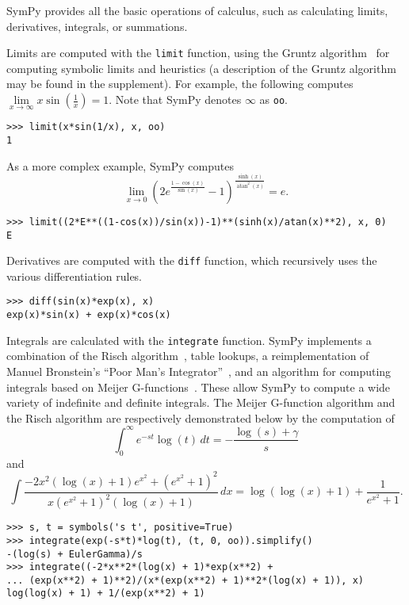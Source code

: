 SymPy provides all the basic operations of calculus, such as calculating
limits, derivatives, integrals, or summations.

Limits are computed with the \verb|limit| function, using the Gruntz
algorithm~\cite{Gruntz1996limits} for computing symbolic limits and heuristics (a description of the Gruntz algorithm may be found in the supplement).
For example, the following computes
$\lim\limits_{x\to \infty} x\sin(\frac{1}{x})=1$. Note that SymPy denotes
$\infty$ as \verb|oo|.
\begin{verbatim}
>>> limit(x*sin(1/x), x, oo)
1
\end{verbatim}
As a more complex example, SymPy computes \[\lim\limits_{x\to 0}{\left(2 e^{\frac{1 - \cos{\left (x \right )}}{\sin{\left (x \right )}}} -
  1\right)}^{\frac{\sinh{\left (x \right )}}{\operatorname{atan}^{2}{\left (x
      \right )}}} = e.\]
\begin{verbatim}
>>> limit((2*E**((1-cos(x))/sin(x))-1)**(sinh(x)/atan(x)**2), x, 0)
E
\end{verbatim}

Derivatives are computed with the \verb|diff| function, which recursively uses
the various differentiation rules.
\begin{verbatim}
>>> diff(sin(x)*exp(x), x)
exp(x)*sin(x) + exp(x)*cos(x)
\end{verbatim}

Integrals are calculated with the \verb|integrate| function. SymPy
implements a combination of the Risch
algorithm~\cite{bronstein2005integration}, table lookups, a reimplementation
of Manuel Bronstein's ``Poor Man's Integrator''~\cite{Bronstein2005pmint}, and
an algorithm for computing integrals based on Meijer G-functions~\cite{Roach1996hyper,roach1997meijerg}. These allow
SymPy to compute a wide variety of indefinite and definite integrals. The
Meijer G-function algorithm and the Risch algorithm are respectively
demonstrated below by the computation of \[\int_{0}^{\infty} e^{-s t}\log{\left (t \right )}\, dt = - \frac{ \log{\left (s \right )} + \gamma}{s}\] and \[\int \frac{- 2 x^{2} \left(\log{\left (x \right )} + 1\right) e^{x^{2}} + {\left(e^{x^{2}} + 1\right)}^{2}}{x {\left(e^{x^{2}} + 1\right)}^{2} \left(\log{\left (x \right )} + 1\right)}\, dx = \log{\left (\log{\left (x \right )} + 1 \right )} + \frac{1}{e^{x^{2}} + 1}.\]
\begin{verbatim}
>>> s, t = symbols('s t', positive=True)
>>> integrate(exp(-s*t)*log(t), (t, 0, oo)).simplify()
-(log(s) + EulerGamma)/s
>>> integrate((-2*x**2*(log(x) + 1)*exp(x**2) +
... (exp(x**2) + 1)**2)/(x*(exp(x**2) + 1)**2*(log(x) + 1)), x)
log(log(x) + 1) + 1/(exp(x**2) + 1)
\end{verbatim}

